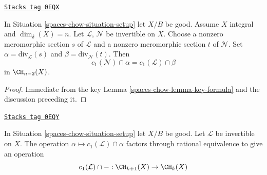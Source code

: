 \begin{lemma}
\label{spaces-chow-lemma-commutativity-on-integral}
\href{https://stacks.math.columbia.edu/tag/0EQX}{\texttt{Stacks tag 0EQX}}

In Situation \ref{spaces-chow-situation-setup} let $X/B$ be good.
Assume $X$ integral and $\dim_\delta(X) = n$.
Let $\mathcal{L}$, $\mathcal{N}$ be invertible on $X$.
Choose a nonzero meromorphic section $s$ of $\mathcal{L}$
and a nonzero meromorphic section $t$ of $\mathcal{N}$.
Set $\alpha = \text{div}_\mathcal{L}(s)$ and
$\beta = \text{div}_\mathcal{N}(t)$.
Then
$$
c_1(\mathcal{N}) \cap \alpha
=
c_1(\mathcal{L}) \cap \beta
$$
in $\CH_{n - 2}(X)$.
\end{lemma}

\begin{proof}
Immediate from the key Lemma \ref{spaces-chow-lemma-key-formula}
and the discussion preceding it.
\end{proof}

\begin{lemma}[Factors]
\label{spaces-chow-lemma-factors}
\href{https://stacks.math.columbia.edu/tag/0EQY}{\texttt{Stacks tag 0EQY}}

In Situation \ref{spaces-chow-situation-setup} let $X/B$ be good.
Let $\mathcal{L}$ be invertible on $X$.
The operation $\alpha \mapsto c_1(\mathcal{L}) \cap \alpha$
factors through rational equivalence to give an operation
$$
c_1(\mathcal{L}) \cap - : \CH_{k + 1}(X) \to \CH_k(X)
$$
\end{lemma}

